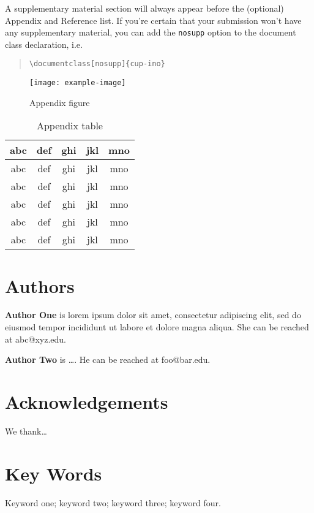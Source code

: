 \documentclass{cup-ino}
\begin{document}
\blinddocument

A supplementary material section will always appear before the (optional) Appendix and Reference list. If you're certain that your submission won't have any supplementary material, you can add the \texttt{nosupp} option to the document class declaration, i.e. 
\begin{quote}
\verb|\documentclass[nosupp]{cup-ino}|    
\end{quote}

\appendix

\begin{figure}[hbt!]
    \centering
    \texttt{[image: example-image]}
    \caption{Appendix figure}
    \label{app:fig}
\end{figure}

\begin{table}[hbt!]
    \caption{Appendix table}
\label{app:tab1}
\begin{tabular}{c c c c c}
\toprule
     abc & def & ghi & jkl & mno \\
\midrule
     abc & def & ghi & jkl & mno \\
     abc & def & ghi & jkl & mno \\
     abc & def & ghi & jkl & mno \\
     abc & def & ghi & jkl & mno \\
     abc & def & ghi & jkl & mno \\
\bottomrule
\end{tabular}
\end{table}


\printbibliography%

\section*{Authors}
\begin{authorbio}
\textbf{Author One} is lorem ipsum dolor sit amet, consectetur adipiscing elit, sed do eiusmod tempor incididunt ut labore et dolore magna aliqua. She can be reached at abc@xyz.edu.

\textbf{Author Two} is \ldots. He can be reached at foo@bar.edu.
\end{authorbio}

\section*{Acknowledgements}
We thank\ldots

\section*{Key Words}
Keyword one; keyword two; keyword three; keyword four.
\end{document}
